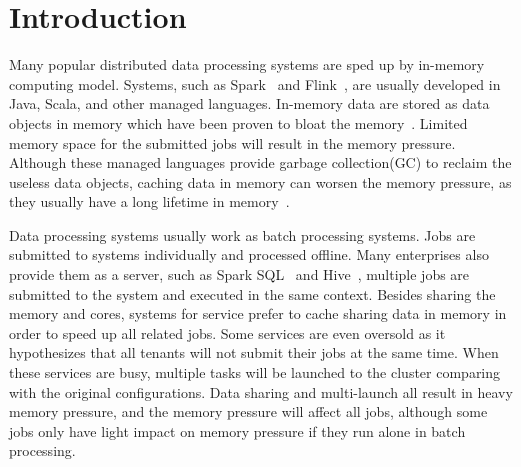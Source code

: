 \section{Introduction}

Many popular distributed data processing systems are sped up by in-memory computing model. Systems, such as Spark~\cite{zaharia2012resilient} and Flink~\cite{hueske2012opening}, are usually developed in Java, Scala, and other managed languages. In-memory data are stored as data objects in memory which have been proven to bloat the memory~\cite{bu:bloat}. Limited memory space for the submitted jobs will result in the memory pressure. Although these managed languages provide garbage collection(GC) to reclaim the useless data objects, caching data in memory can worsen the memory pressure, as they usually have a long lifetime in memory~\cite{lulu:deca}. 

Data processing systems usually work as batch processing systems. Jobs are submitted to systems individually and processed offline. Many enterprises also provide them as a server, such as Spark SQL~\cite{armbrust2015spark} and Hive~\cite{ashish:hive}, multiple jobs are submitted to the system and executed in the same context. Besides sharing the memory and cores, systems for service prefer to cache sharing data in memory in order to speed up all related jobs.
Some services are even oversold as it hypothesizes that all tenants will not submit their jobs at the same time. When these services are busy, multiple tasks will be launched to the cluster comparing with the original configurations. Data sharing and multi-launch all result in heavy memory pressure, and the memory pressure will affect all jobs, although some jobs only have light impact on memory pressure if they run alone in batch processing.


